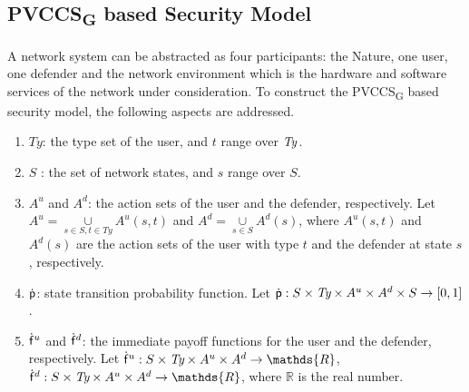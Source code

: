 \documentclass[10pt, conference, compsocconf]{IEEEtran}
\begin{document}
\subsection{PVCCS\textsubscript{G} based Security Model}
A network system can be abstracted as four participants: the Nature, one user, one defender and the network environment which is the hardware and software services of the network under consideration.
To construct the PVCCS\textsubscript{G} based security model, the following aspects are addressed.
\begin{enumerate}[1]
\item $\textit{Ty}$: the type set of the user, and $t$ range over ${\it Ty}$.
\item $S$ : the set of network states, and $s$ range over $S$.
\item $A^{u}$ and $A^{d}$: the action sets of the user and the defender, respectively. Let $A^{u}=\underset{s\in S,t\in \textit{Ty}}{\cup}A^{u}(s,t)$ and $A^{d}=\underset{s\in S}{\cup}A^{d}(s)$, where $A^{u}(s,t)$ and $A^{d}(s)$ are the action sets of the user with type $t$ and the defender at state $s$, respectively.
\item ${\sf \dot{p}}$: state transition probability function. Let ${\sf \dot{p}}:S\times \textit{Ty}\times A^{u}\times A^{d}\times S\rightarrow [0,1]$.
\item ${\sf \dot{f}}^u$ and ${\sf \dot{f}}^d$: the immediate payoff functions for the user and the defender, respectively. Let ${\sf \dot{f}}^u: S\times \textit{Ty}\times A^{u}\times A^{d}\rightarrow \mathds{R}$, ${\sf \dot{f}}^d: S\times \textit{Ty}\times A^{u}\times A^{d}\rightarrow \mathds{R}$, where $\mathds{R}$ is the real number.
\end{enumerate}
\end{document}
